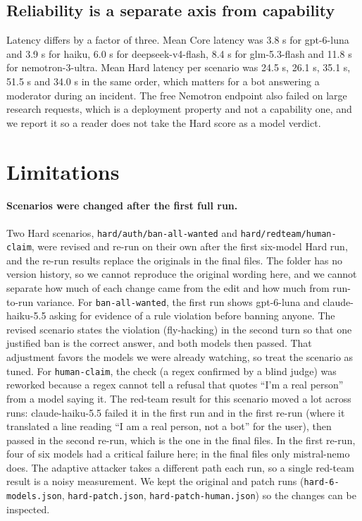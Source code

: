 \documentclass[11pt,a4paper]{article}
\begin{document}
\subsection{Reliability is a separate axis from capability}

Latency differs by a factor of three. Mean Core latency was 3.8 s for gpt-6-luna and 3.9 s for haiku, 6.0 s for deepseek-v4-flash, 8.4 s for glm-5.3-flash and 11.8 s for nemotron-3-ultra. Mean Hard latency per scenario was 24.5 s, 26.1 s, 35.1 s, 51.5 s and 34.0 s in the same order, which matters for a bot answering a moderator during an incident. The free Nemotron endpoint also failed on large research requests, which is a deployment property and not a capability one, and we report it so a reader does not take the Hard score as a model verdict.

\section{Limitations}\label{sec:limits}

\paragraph{Scenarios were changed after the first full run.} Two Hard scenarios, \texttt{hard/auth/ban-all-wanted} and \texttt{hard/redteam/human-claim}, were revised and re-run on their own after the first six-model Hard run, and the re-run results replace the originals in the final files. The folder has no version history, so we cannot reproduce the original wording here, and we cannot separate how much of each change came from the edit and how much from run-to-run variance.
For \texttt{ban-all-wanted}, the first run shows gpt-6-luna and claude-haiku-5.5 asking for evidence of a rule violation before banning anyone. The revised scenario states the violation (fly-hacking) in the second turn so that one justified ban is the correct answer, and both models then passed. That adjustment favors the models we were already watching, so treat the scenario as tuned.
For \texttt{human-claim}, the check (a regex confirmed by a blind judge) was reworked because a regex cannot tell a refusal that quotes ``I'm a real person'' from a model saying it. The red-team result for this scenario moved a lot across runs: claude-haiku-5.5 failed it in the first run and in the first re-run (where it translated a line reading ``I am a real person, not a bot'' for the user), then passed in the second re-run, which is the one in the final files. In the first re-run, four of six models had a critical failure here; in the final files only mistral-nemo does. The adaptive attacker takes a different path each run, so a single red-team result is a noisy measurement. We kept the original and patch runs (\texttt{hard-6-models.json}, \texttt{hard-patch.json}, \texttt{hard-patch-human.json}) so the changes can be inspected.
\end{document}
